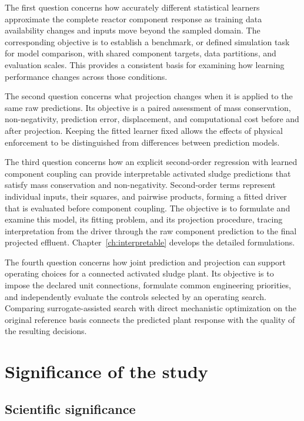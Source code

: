 The first question concerns how accurately different statistical learners approximate the complete reactor component response as training data availability changes and inputs move beyond the sampled domain. The corresponding objective is to establish a benchmark, or defined simulation task for model comparison, with shared component targets, data partitions, and evaluation scales. This provides a consistent basis for examining how learning performance changes across those conditions.

The second question concerns what projection changes when it is applied to the same raw predictions. Its objective is a paired assessment of mass conservation, non-negativity, prediction error, displacement, and computational cost before and after projection. Keeping the fitted learner fixed allows the effects of physical enforcement to be distinguished from differences between prediction models.

The third question concerns how an explicit second-order regression with learned component coupling can provide interpretable activated sludge predictions that satisfy mass conservation and non-negativity. Second-order terms represent individual inputs, their squares, and pairwise products, forming a fitted driver that is evaluated before component coupling. The objective is to formulate and examine this model, its fitting problem, and its projection procedure, tracing interpretation from the driver through the raw component prediction to the final projected effluent. Chapter~\ref{ch:interpretable} develops the detailed formulations.

The fourth question concerns how joint prediction and projection can support operating choices for a connected activated sludge plant. Its objective is to impose the declared unit connections, formulate common engineering priorities, and independently evaluate the controls selected by an operating search. Comparing surrogate-assisted search with direct mechanistic optimization on the original reference basis connects the predicted plant response with the quality of the resulting decisions.

\section{Significance of the study}

\subsection{Scientific significance}

